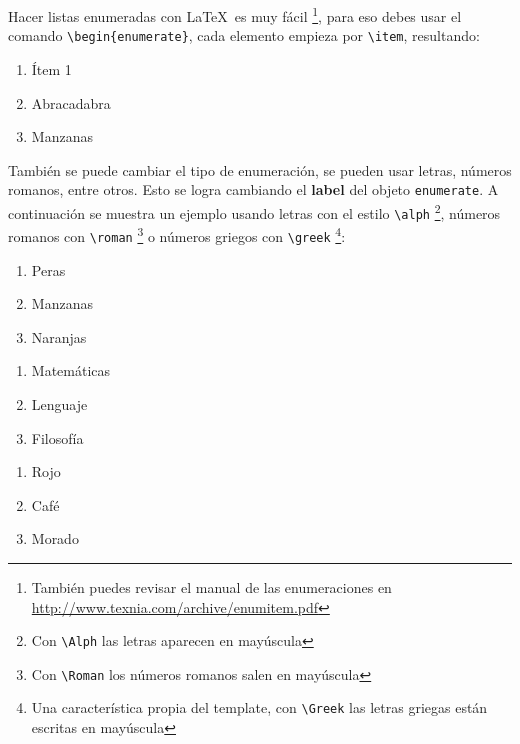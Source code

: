	
		
		Hacer listas enumeradas con \LaTeX\ es muy fácil \footnote{También puedes revisar el manual de las enumeraciones en \url{http://www.texnia.com/archive/enumitem.pdf}}, para eso debes usar el comando \texttt{\textbackslash begin\{enumerate\}}, cada elemento empieza por \texttt{\textbackslash item}, resultando:
		
		\begin{enumerate}
			\item Ítem 1
			\item Abracadabra
			\item Manzanas
		\end{enumerate}
		
		También se puede cambiar el tipo de enumeración, se pueden usar letras, números romanos, entre otros. Esto se logra cambiando el \textbf{label} del objeto \texttt{enumerate}. A continuación se muestra un ejemplo usando letras con el estilo \texttt{\textbackslash alph} \footnote{Con \texttt{\textbackslash Alph} las letras aparecen en mayúscula}, números romanos con \texttt{\textbackslash roman} \footnote{Con \texttt{\textbackslash Roman} los números romanos salen en mayúscula} o números griegos con \texttt{\textbackslash greek} \footnote{Una característica propia del template, con \texttt{\textbackslash Greek} las letras griegas están escritas en mayúscula}:
		
		\begin{multicols}{3}
			\begin{enumerate}[label=\alph*) ,font=\bfseries] %
				\item Peras
				\item Manzanas
				\item Naranjas
			\end{enumerate}
			
			\begin{enumerate}[label=\greek*) ]
				\item Matemáticas
				\item Lenguaje
				\item Filosofía
			\end{enumerate}
		
			\begin{enumerate}[label=\roman*) ]
				\item Rojo
				\item Café
				\item Morado
			\end{enumerate}
		\end{multicols}
		
